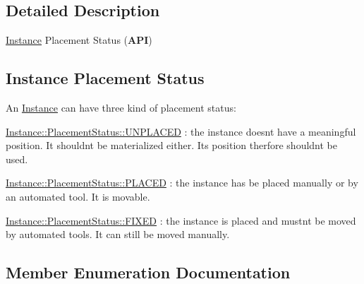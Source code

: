 \subsection{Detailed Description}
\hyperlink{classHurricane_1_1Instance}{Instance} Placement Status ({\bfseries A\+PI}) 

\hypertarget{classHurricane_1_1Instance_1_1PlacementStatus_secInstancePStatus}{}\subsection{Instance Placement Status}\label{classHurricane_1_1Instance_1_1PlacementStatus_secInstancePStatus}
An \hyperlink{classHurricane_1_1Instance}{Instance} can have three kind of placement status\+:
\begin{DoxyItemize}
\item \hyperlink{classHurricane_1_1Instance_1_1PlacementStatus_af76cc0838783b3eb3a515eb3c3e0f7bfa3e19a0a1b3e8c8fd860164df7f935216}{Instance\+::\+Placement\+Status\+::\+U\+N\+P\+L\+A\+C\+ED} \+: the instance doesn\textquotesingle{}t have a meaningful position. It shouldn\textquotesingle{}t be materialized either. It\textquotesingle{}s position therfore shouldn\textquotesingle{}t be used.
\item \hyperlink{classHurricane_1_1Instance_1_1PlacementStatus_af76cc0838783b3eb3a515eb3c3e0f7bfaf3589c11ecd7d5de63db24826b74d457}{Instance\+::\+Placement\+Status\+::\+P\+L\+A\+C\+ED} \+: the instance has be placed manually or by an automated tool. It is movable.
\item \hyperlink{classHurricane_1_1Instance_1_1PlacementStatus_af76cc0838783b3eb3a515eb3c3e0f7bfa47be8a40f04081635fe24485ae7c6bd7}{Instance\+::\+Placement\+Status\+::\+F\+I\+X\+ED} \+: the instance is placed and mustn\textquotesingle{}t be moved by automated tools. It can still be moved manually. 
\end{DoxyItemize}

\subsection{Member Enumeration Documentation}
\mbox{\label{classHurricane_1_1Instance_1_1PlacementStatus_af76cc0838783b3eb3a515eb3c3e0f7bf}} 
